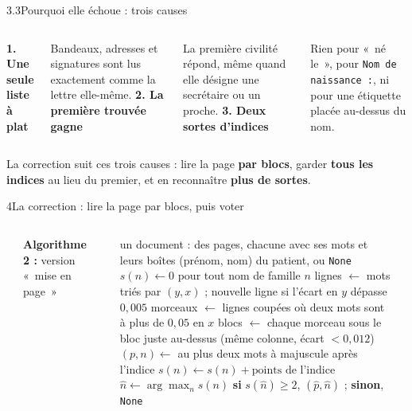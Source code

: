 \documentclass[11pt,aspectratio=169]{beamer}
\newcommand{\tok}[1]{\foreignlanguage{english}{\texttt{#1}}}
\newenvironment{algo}[1]{%
  \par\noindent\rule{\linewidth}{0.8pt}\par\vspace{2pt}%
  \noindent\footnotesize #1\par\vspace{-4pt}%
  \noindent\rule{\linewidth}{0.4pt}\par\vspace{-2pt}%
}{%
  \par\vspace{-6pt}\noindent\rule{\linewidth}{0.8pt}\par
}
\begin{document}
\begin{frame}{3.3\quad Pourquoi elle échoue : trois causes}
  \begin{columns}[T]
    \textbf{1. Une seule liste à plat}\par\smallskip
    \small Bandeaux, adresses et signatures sont lus exactement comme la lettre elle-même.
    \textbf{2. La première trouvée gagne}\par\smallskip
    \small La première civilité répond, même quand elle désigne une secrétaire ou un proche.
    \textbf{3. Deux sortes d'indices}\par\smallskip
    \small Rien pour «~né le~», pour \tok{Nom de naissance :}, ni pour une étiquette placée
    au-dessus du nom.
  \end{columns}

  \vspace{1.6em}
  La correction suit ces trois causes : lire la page \textbf{par blocs}, garder
  \textbf{tous les indices} au lieu du premier, et en reconnaître \textbf{plus de sortes}.
\end{frame}

\begin{frame}{4\quad La correction : lire la page par blocs, puis voter}
  \begin{columns}[T]
    \begin{algo}{\textbf{Algorithme 2 :} version «~mise en page~»}
    \begin{algorithmic}[1]
      \Require un document : des pages, chacune avec ses mots et leurs boîtes
      \Ensure (prénom, nom) du patient, ou \tok{None}
      \State $s(n) \gets 0$ pour tout nom de famille $n$
        \State lignes $\gets$ mots triés par $(y, x)$ ; nouvelle ligne si l'écart en $y$
          dépasse $0{,}005$
        \State morceaux $\gets$ lignes coupées où deux mots sont à plus de $0{,}05$ en $x$
        \State blocs $\gets$ chaque morceau sous le bloc juste au-dessus (même colonne,
          écart $< 0{,}012$)
            \State $(p, n) \gets$ au plus deux mots à majuscule après l'indice
            \State $s(n) \gets s(n) + \text{points de l'indice}$
          \EndFor
        \EndFor
      \EndFor
      \State $\hat n \gets \arg\max_n s(n)$
      \State \textbf{si} $s(\hat n) \ge 2$, \Return $(\hat p, \hat n)$ ; \textbf{sinon},
        \Return \tok{None}
    \end{algorithmic}
    \end{algo}
  \end{columns}
\end{frame}
\end{document}
